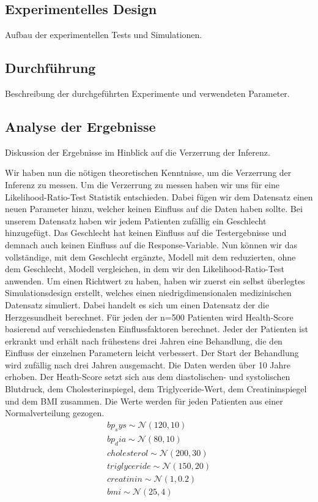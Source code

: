 \documentclass[%
thesis=student,%
coverpage=false,%
titlepage=false,%
headmarks=true, %
german,%
font=libertine, %
math=newpxtx, %
BCOR=5mm,%
coverBCOR=11mm%
]{tumbook}
\theoremstyle{break}
\begin{document}
\subsection{Experimentelles Design}
Aufbau der experimentellen Tests und Simulationen.
\subsection{Durchführung}
Beschreibung der durchgeführten Experimente und verwendeten Parameter.
\subsection{Analyse der Ergebnisse}
Diskussion der Ergebnisse im Hinblick auf die Verzerrung der Inferenz.

Wir haben nun die nötigen theoretischen Kenntnisse, um die Verzerrung der Inferenz zu messen. Um die Verzerrung zu messen haben wir uns für eine Likelihood-Ratio-Test Statistik entschieden. Dabei fügen wir dem Datensatz einen neuen Parameter hinzu, welcher keinen Einfluss auf die Daten haben sollte. Bei unserem Datensatz haben wir jedem Patienten zufällig ein Geschlecht hinzugefügt. Das Geschlecht hat keinen Einfluss auf die Testergebnisse und demnach auch keinen Einfluss auf die Response-Variable. 
Nun können wir das vollständige, mit dem Geschlecht ergänzte, Modell mit dem reduzierten, ohne dem Geschlecht, Modell vergleichen, in dem wir den Likelihood-Ratio-Test anwenden. 
Um einen Richtwert zu haben, haben wir zuerst ein selbst überlegtes Simulationsdesign erstellt, welches einen niedrigdimensionalen medizinischen Datensatz simuliert. Dabei handelt es sich um einen Datensatz der die Herzgesundheit berechnet. Für jeden der n=500 Patienten wird Health-Score basierend auf verschiedensten Einflussfaktoren berechnet. Jeder der Patienten ist erkrankt und erhält nach frühestens drei Jahren eine Behandlung, die den Einfluss der einzelnen Parametern leicht verbessert. Der Start der Behandlung wird zufällig nach drei Jahren ausgemacht. Die Daten werden über 10 Jahre erhoben. Der Heath-Score setzt sich aus dem diastolischen- und systolischen Blutdruck, dem Cholesterinspiegel, dem Triglyceride-Wert, dem Creatininspiegel und dem BMI zusammen. Die Werte werden für jeden Patienten aus einer Normalverteilung gezogen.
\begin{align*}
	bp_sys \sim \mathcal{N}(120,10) \\
	bp_dia \sim \mathcal{N}(80,10) \\
	cholesterol \sim \mathcal{N}(200,30) \\
	triglyceride \sim \mathcal{N}(150,20) \\
	creatinin \sim \mathcal{N}(1,0.2) \\
	bmi \sim \mathcal{N}(25,4) \\
\end{align*} \noindent
\end{document}
